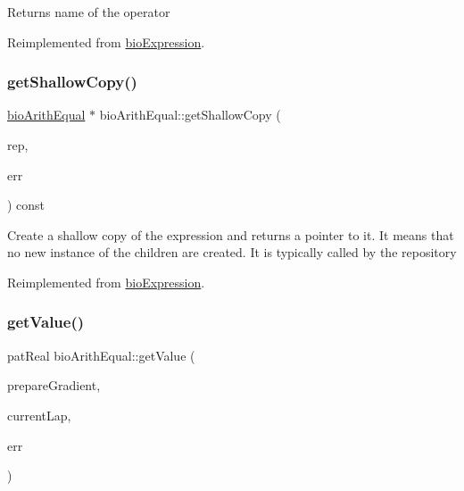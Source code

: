 \begin{DoxyReturn}{Returns}
name of the operator 
\end{DoxyReturn}


Reimplemented from \hyperlink{classbio_expression_a2353a4afb3a2b0af7c63aba086a72bde}{bio\+Expression}.

\mbox{\label{classbio_arith_equal_ace5ebcd053feb9fa4a7e97920fdfe030}} 
\subsubsection{\texorpdfstring{get\+Shallow\+Copy()}{getShallowCopy()}}
{\footnotesize\ttfamily \hyperlink{classbio_arith_equal}{bio\+Arith\+Equal} $\ast$ bio\+Arith\+Equal\+::get\+Shallow\+Copy (\begin{DoxyParamCaption}\item[{\hyperlink{classbio_expression_repository}{bio\+Expression\+Repository} $\ast$}]{rep,  }\item[{pat\+Error $\ast$\&}]{err }\end{DoxyParamCaption}) const\hspace{0.3cm}{\ttfamily [virtual]}}

Create a shallow copy of the expression and returns a pointer to it. It means that no new instance of the children are created. It is typically called by the repository 

Reimplemented from \hyperlink{classbio_expression_a442534762693b92baaf33928979a1bf8}{bio\+Expression}.

\mbox{\label{classbio_arith_equal_a7db4558e7e275cdf8cb525a23d7dac28}} 
\subsubsection{\texorpdfstring{get\+Value()}{getValue()}}
{\footnotesize\ttfamily pat\+Real bio\+Arith\+Equal\+::get\+Value (\begin{DoxyParamCaption}\item[{pat\+Boolean}]{prepare\+Gradient,  }\item[{pat\+U\+Long}]{current\+Lap,  }\item[{pat\+Error $\ast$\&}]{err }\end{DoxyParamCaption})\hspace{0.3cm}{\ttfamily [virtual]}}

